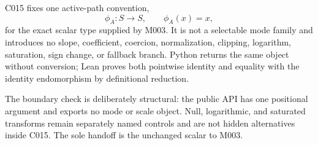 C015 fixes one active-path convention,
\[
  \phi_A:S\to S,\qquad \phi_A(x)=x,
\]
for the exact scalar type supplied by M003.  It is not a selectable mode family
and introduces no slope, coefficient, coercion, normalization, clipping,
logarithm, saturation, sign change, or fallback branch.  Python returns the
same object without conversion; Lean proves both pointwise identity and
equality with the identity endomorphism by definitional reduction.

The boundary check is deliberately structural: the public API has one
positional argument and exports no mode or scale object.  Null, logarithmic,
and saturated transforms remain separately named controls and are not hidden
alternatives inside C015.  The sole handoff is the unchanged scalar to M003.
